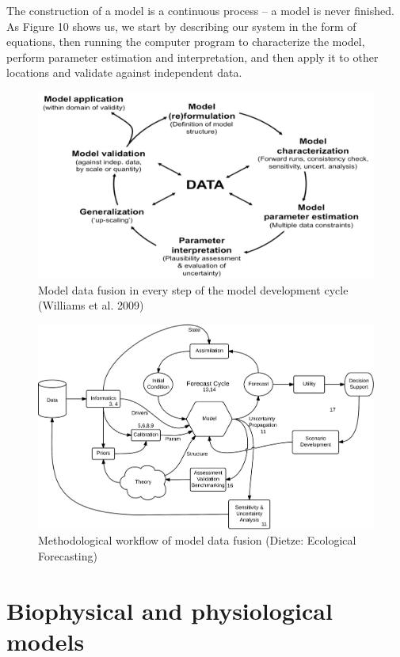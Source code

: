 \documentclass[
  12pt,
  oneside]{book}
\begin{document}
The construction of a model is a continuous process -- a model is never finished. As Figure 10 shows us, we start by describing our system in the form of equations, then running the computer program to characterize the model, perform parameter estimation and interpretation, and then apply it to other locations and validate against independent data.

\begin{figure}

{\centering \includegraphics[width=0.8\linewidth]{figures/chap1/williams_fusion} 

}

\caption{Model data fusion in every step of the model development cycle (Williams et al. 2009)}\label{fig:f13}
\end{figure}

\begin{figure}

{\centering \includegraphics[width=0.8\linewidth]{figures/chap1/dietze_workflow} 

}

\caption{Methodological workflow of model data fusion (Dietze: Ecological Forecasting)}\label{fig:f14}
\end{figure}

\hypertarget{part-biophysical-and-physiological-models}{%
\part{Biophysical and physiological models}\label{part-biophysical-and-physiological-models}}
\end{document}
